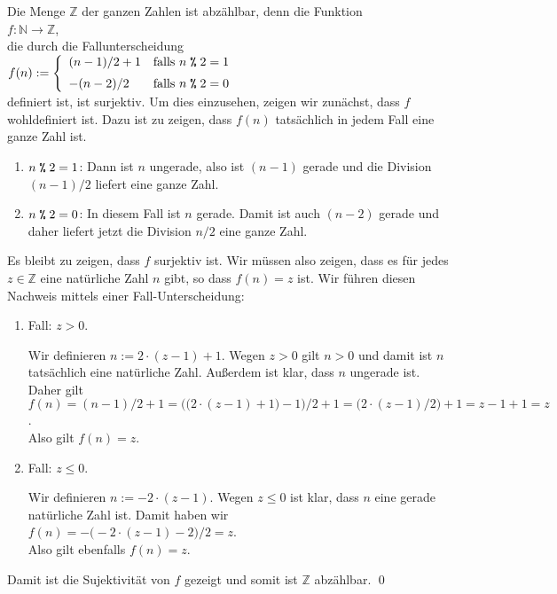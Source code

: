 \example
Die Menge $\mathbb{Z}$ der ganzen Zahlen ist abzählbar, denn die Funktion
\\[0.2cm]
\hspace*{1.3cm}
$f: \mathbb{N} \rightarrow \mathbb{Z}$,
\\[0.2cm]
die durch die Fallunterscheidung
\\[0.2cm]
\hspace*{1.3cm}
$f(n) := \left\{ \begin{array}[c]{ll}
                 (n - 1) / 2 + 1  & \mbox{falls $n \;\texttt{\%}\; 2 = 1$}  \\[0.2cm]
                 - (n - 2) / 2          & \mbox{falls $n \;\texttt{\%}\; 2 = 0$}
                 \end{array}
         \right.
$ 
\\[0.2cm]
definiert ist, ist surjektiv.  Um dies einzusehen, zeigen wir zunächst, dass $f$ wohldefiniert ist.
Dazu ist zu zeigen, dass $f(n)$ tatsächlich in jedem Fall eine ganze Zahl ist.
\begin{enumerate}
\item $n \;\texttt{\%}\; 2 = 1$:  Dann ist $n$ ungerade, also ist $(n-1)$ gerade und die Division
      $(n-1)/2$ liefert eine ganze Zahl.
\item $n \;\texttt{\%}\; 2 = 0$:  In diesem Fall ist $n$ gerade.  Damit ist auch $(n-2)$ gerade und daher
      liefert jetzt die Division $n/2$ eine ganze Zahl.
\end{enumerate}
Es bleibt zu zeigen, dass $f$ surjektiv ist.  Wir müssen also zeigen, dass es für jedes 
$z \in \mathbb{Z}$ eine natürliche Zahl $n$ gibt, so dass $f(n) = z$ ist.  Wir führen diesen Nachweis
mittels einer Fall-Unterscheidung:
\begin{enumerate}
\item Fall: $z > 0$.
  
      Wir definieren $n := 2 \cdot (z - 1) + 1$.  Wegen $z >0$ gilt $n > 0$ und damit ist $n$
      tatsächlich eine natürliche Zahl.  Außerdem ist klar, dass $n$ ungerade ist. Daher gilt
      \\[0.2cm]
      \hspace*{0.3cm}
      $f(n) = (n - 1)/2 + 1 = \bigl(\bigl(2 \cdot (z - 1) + 1\bigr) - 1\bigr)/2 + 1 
            = \bigl(2 \cdot (z - 1)/2\bigr) + 1= z-1 + 1 = z
      $.
      \\[0.2cm]
      Also gilt $f(n) = z$.
\item Fall: $z \leq 0$.

      Wir definieren $n := - 2 \cdot (z - 1)$.  Wegen $z \leq 0$ ist klar, dass $n$ eine gerade 
      natürliche Zahl ist.  Damit haben wir
      \\[0.2cm]
      \hspace*{1.3cm}
      $f(n) = -\bigl(-2 \cdot (z - 1) - 2\bigr)/2 = z$.
      \\[0.2cm]
      Also gilt ebenfalls $f(n) = z$.
\end{enumerate}
Damit ist die Sujektivität von $f$ gezeigt und somit ist $\mathbb{Z}$ abzählbar.
\qed

